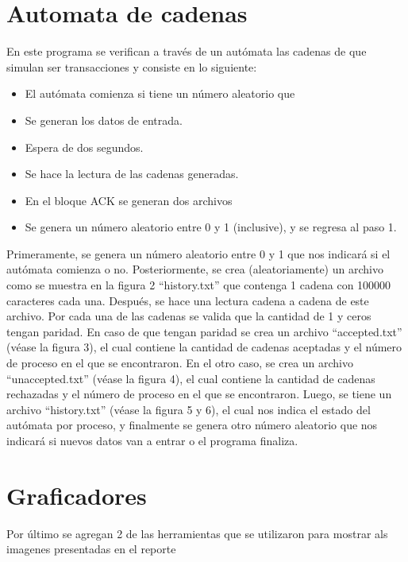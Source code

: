 \documentclass[a4paper]{article}
\begin{document}
		\section{Automata de cadenas}
			En este programa se verifican a través de un autómata las cadenas de que simulan ser transacciones y consiste en lo siguiente: 
			\begin{itemize}
                \item El autómata comienza si tiene un número aleatorio que 
                \item Se generan los datos de entrada.
                \item Espera de dos segundos.
                \item Se hace la lectura de las cadenas generadas.
                \item En el bloque ACK se generan dos archivos 
                \item  Se genera un número aleatorio entre 0 y 1 (inclusive), y se regresa al paso 1. 
            \end{itemize}
            Primeramente, se genera un número aleatorio entre 0 y 1 que nos indicará si el autómata comienza o no.
            Posteriormente, se crea (aleatoriamente) un archivo como se muestra en la figura 2 ``history.txt''  que contenga 1 cadena con 100000 caracteres cada una.
            Después, se hace una lectura cadena a cadena de este archivo. Por cada una de las cadenas se valida que la cantidad de 1 y ceros tengan paridad. 
            En caso de que tengan paridad se crea un archivo ``accepted.txt'' (véase la figura 3), el cual contiene la cantidad de cadenas aceptadas y el número de proceso en el que se encontraron. 
            En el otro caso, se crea un archivo ``unaccepted.txt'' (véase la figura 4), el cual contiene la cantidad de cadenas rechazadas y el número de proceso en el que se encontraron. 
            Luego, se tiene un archivo ``history.txt'' (véase la figura 5 y 6), el cual nos indica el estado del autómata por proceso, y finalmente se genera otro número aleatorio que nos indicará si nuevos datos van a entrar o el programa finaliza. 
            

        \section{Graficadores}
            Por último se agregan 2 de las herramientas que se utilizaron para mostrar als imagenes presentadas en el reporte
\end{document}
